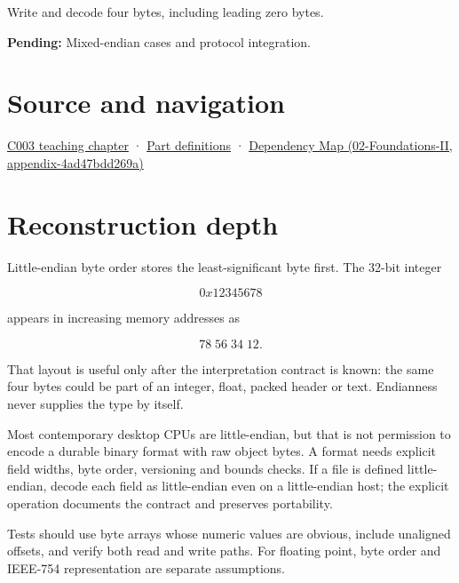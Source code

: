 Write and decode four bytes, including leading zero bytes.

\textbf{Pending:} Mixed-endian cases and protocol integration.

\section{Source and navigation}\label{appendix-367b6abf460e-source-and-navigation}

\href{Continuous\%20Notes/Computing\%20Foundations\%20-\%20From\%20Bits\%20to\%20C++\%20and\%20Systems\%20APIs\#Where\%20the\%20bytes\%20live}{C003 teaching chapter} · \hyperref[appendix-fd090d982a15-m003---parts-41-60]{Part definitions} · \href{../02-Foundations-II/main.pdf\#nameddest=appendix-4ad47bdd269a}{Dependency Map (02-Foundations-II, appendix-4ad47bdd269a)}

\section{Reconstruction depth}\label{appendix-367b6abf460e-reconstruction-depth}

Little-endian byte order stores the least-significant byte first. The 32-bit integer

\[
0x12345678
\]

appears in increasing memory addresses as

\[
78\;56\;34\;12.
\]

That layout is useful only after the interpretation contract is known: the same four bytes could be part of an integer, float, packed header or text. Endianness never supplies the type by itself.

Most contemporary desktop CPUs are little-endian, but that is not permission to encode a durable binary format with raw object bytes. A format needs explicit field widths, byte order, versioning and bounds checks. If a file is defined little-endian, decode each field as little-endian even on a little-endian host; the explicit operation documents the contract and preserves portability.

Tests should use byte arrays whose numeric values are obvious, include unaligned offsets, and verify both read and write paths. For floating point, byte order and IEEE-754 representation are separate assumptions.
